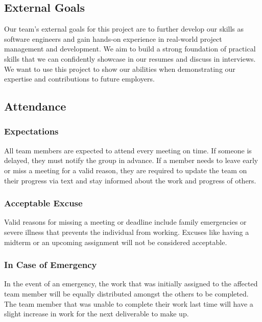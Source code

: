 \documentclass{article}
\begin{document}

\subsection*{External Goals}
Our team’s external goals for this project are to further develop our skills as software engineers and gain hands-on experience in real-world project management and development. We aim to build a strong foundation of practical skills that we can confidently showcase in our resumes and discuss in interviews. We want to use this project to show our abilities when demonstrating our expertise and contributions to future employers.

\subsection*{Attendance}

\subsubsection*{Expectations}
All team members are expected to attend every meeting on time. If someone is delayed, they must notify the group in advance. If a member needs to leave early or miss a meeting for a valid reason, they are required to update the team on their progress via text and stay informed about the work and progress of others.

\subsubsection*{Acceptable Excuse}
Valid reasons for missing a meeting or deadline include family emergencies or severe illness that prevents the individual from working. Excuses like having a midterm or an upcoming assignment will not be considered acceptable.

\subsubsection*{In Case of Emergency}
In the event of an emergency, the work that was initially assigned to the affected team member will be equally distributed amongst the others to be completed. The team member that was unable to complete their work last time will have a slight increase in work for the next deliverable to make up.
\end{document}
